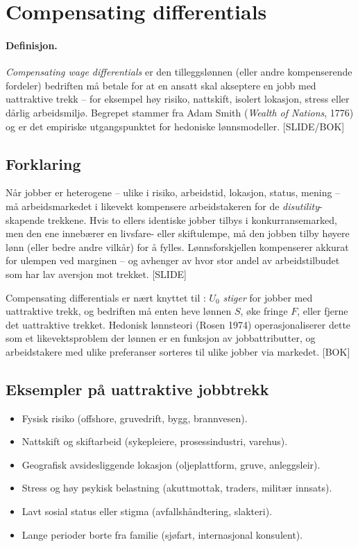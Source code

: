\section{Compensating differentials}\label{thr:compensating-differentials}

\paragraph{Definisjon.} \emph{Compensating wage differentials} er den tilleggslønnen (eller andre kompenserende fordeler) bedriften må betale for at en ansatt skal akseptere en jobb med uattraktive trekk -- for eksempel høy risiko, nattskift, isolert lokasjon, stress eller dårlig arbeidsmiljø. Begrepet stammer fra Adam Smith (\emph{Wealth of Nations}, 1776) og er det empiriske utgangspunktet for hedoniske lønnsmodeller. [SLIDE/BOK]

\subsection*{Forklaring}

Når jobber er heterogene -- ulike i risiko, arbeidstid, lokasjon, status, mening -- må arbeidsmarkedet i likevekt kompensere arbeidstakeren for de \emph{disutility}-skapende trekkene. Hvis to ellers identiske jobber tilbys i konkurransemarked, men den ene innebærer en livsfare- eller skiftulempe, må den jobben tilby høyere lønn (eller bedre andre vilkår) for å fylles. Lønnsforskjellen kompenserer akkurat for ulempen ved marginen -- og avhenger av hvor stor andel av arbeidstilbudet som har lav aversjon mot trekket. [SLIDE]

Compensating differentials er nært knyttet til : $U_0$ \emph{stiger} for jobber med uattraktive trekk, og bedriften må enten heve lønnen $S$, øke fringe $F$, eller fjerne det uattraktive trekket. Hedonisk lønnsteori (Rosen 1974) operasjonaliserer dette som et likevektsproblem der lønnen er en funksjon av jobbattributter, og arbeidstakere med ulike preferanser sorteres til ulike jobber via markedet. [BOK]

\subsection*{Eksempler på uattraktive jobbtrekk}
\begin{itemize}
\item Fysisk risiko (offshore, gruvedrift, bygg, brannvesen).
\item Nattskift og skiftarbeid (sykepleiere, prosessindustri, varehus).
\item Geografisk avsidesliggende lokasjon (oljeplattform, gruve, anleggsleir).
\item Stress og høy psykisk belastning (akuttmottak, traders, militær innsats).
\item Lavt sosial status eller stigma (avfallshåndtering, slakteri).
\item Lange perioder borte fra familie (sjøfart, internasjonal konsulent).
\end{itemize}

